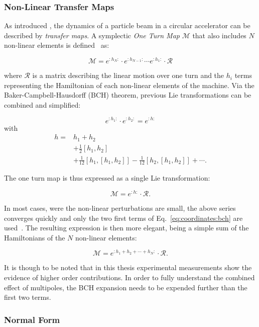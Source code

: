 \subsubsection{Non-Linear Transfer Maps}

As introduced , the dynamics of a particle beam in a circular accelerator can be
described by \textit{transfer maps}. A symplectic \textit{One Turn Map} $\mathcal{M}$ that also
includes $N$ non-linear elements is defined~\cite{dragt_overview_2013} as:

\begin{equation}
    \mathcal{M} = e^{:h_N:} \cdot e^{:h_{N-1}:} \cdots e^{:h_1:} \cdot \mathcal{R}
\end{equation}

where $\mathcal{R}$ is a matrix describing the linear motion over one turn and the $h_i$ terms
representing the Hamiltonian of each non-linear elements of the machine.
Via the Baker-Campbell-Hausdorff (BCH) theorem, previous Lie transformations can be combined and
simplified:

\begin{equation}
    e^{:h_1:} \cdot e^{:h_2:} = e^{:h:}
\end{equation}
with 
\begin{equation}
    \begin{aligned}
        h =& h_1 + h_2 \\
           & + \frac{1}{2} [h_1, h_2] \\
           & + \frac{1}{12} [h_1, [h_1, h_2]] - \frac{1}{12} [h_2, [h_1, h_2]] + \cdots.
    \end{aligned}
    \label{eq:coordinates:bch}
\end{equation}

The one turn map is thus expressed as a single Lie transformation:

\begin{equation}
    \mathcal{M} = e^{:h:} \cdot \mathcal{R}.
\end{equation}

In most cases, were the non-linear perturbations are small, the above series converges quickly
and only the two first terms of Eq.~\eqref{eq:coordinates:bch} are
used~\cite{carlier_nonlinear_2020-1}. The resulting expression is then more elegant, being a simple
sum of the Hamiltonians of the $N$ non-linear elements:

\begin{equation}
   \mathcal{M} = e^{:h_1 + h_2 + \cdots + h_N:} \cdot \mathcal{R}.
\end{equation}

It is though to be noted that in this thesis experimental measurements show the evidence of higher
order contributions. In order to fully understand the combined effect of multipoles, the BCH
expansion needs to be expended further than the first two terms.


\subsubsection{Normal Form}


